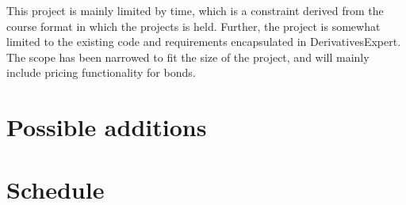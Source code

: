 \documentclass[11pt]{article}
\begin{document}



This project is mainly limited by time, which is a constraint derived from the course format in which the projects is held. Further, the project is somewhat limited to the existing
code and requirements encapsulated in DerivativesExpert. The scope has been narrowed to fit the size of the project, and will mainly include pricing functionality for bonds.

\section*{Possible additions}

\section*{Schedule}



\end{document}
